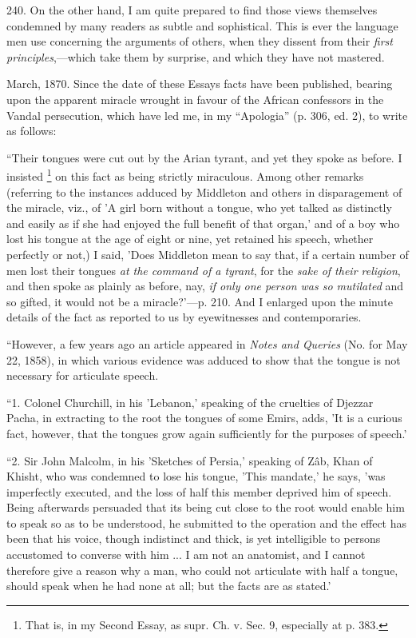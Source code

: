 240.
On the other hand, I am quite prepared to find those views themselves
condemned by many readers as subtle and sophistical. This is ever the
language men use concerning the arguments of others, when they dissent
from their \emph{first principles},—which take them by surprise, and
which they have not mastered.


March, 1870. Since the date of these Essays
facts have been published, bearing upon the apparent miracle wrought
in favour of the African confessors in the Vandal persecution, which
have led me, in my ``Apologia'' (p. 306, ed. 2), to write as
follows:

``Their tongues were cut out by the Arian
tyrant, and yet they spoke as before. I insisted \footnote{That is, in my Second Essay, as supr. Ch. v. Sec.
9, especially at p. 383.}
on this fact as being strictly miraculous. Among other remarks
(referring to the instances adduced by Middleton and others in
disparagement of the miracle, viz., of 'A girl born without a tongue,
who yet talked as distinctly and easily as if she had enjoyed the full
benefit of that organ,' and of a boy who lost his tongue at the age of
eight or nine, yet retained his speech, whether perfectly or not,) I
said, 'Does Middleton mean to say that, if a certain number of men
lost their tongues \emph{at the command of a tyrant}, for the \emph{sake
of their religion}, and then spoke as plainly as before, nay, \emph{if
only one person was so mutilated} and so gifted, it would not be a
miracle?'—p. 210. And I enlarged upon the minute details of the fact
as reported to us by eyewitnesses and contemporaries.

``However, a few years ago an article appeared
in \emph{Notes and Queries} (No. for May 22, 1858), in which various
evidence was adduced to show that the tongue is not necessary for
articulate speech.

``1. Colonel Churchill, in his 'Lebanon,'
speaking of the cruelties of Djezzar Pacha, in extracting to the root
the tongues of some Emirs, adds, 'It is a curious fact, however,
that the tongues grow again sufficiently for the purposes of speech.'

``2. Sir John Malcolm, in his 'Sketches of
Persia,' speaking of Zâb, Khan of Khisht, who was condemned to lose
his tongue, 'This mandate,' he says, 'was imperfectly executed, and
the loss of half this member deprived him of speech. Being afterwards
persuaded that its being cut close to the root would enable him to
speak so as to be understood, he submitted to the operation and the
effect has been that his voice, though indistinct and thick, is yet
intelligible to persons accustomed to converse with him ... I am not
an anatomist, and I cannot therefore give a reason why a man, who
could not articulate with half a tongue, should speak when he had none
at all; but the facts are as stated.'

